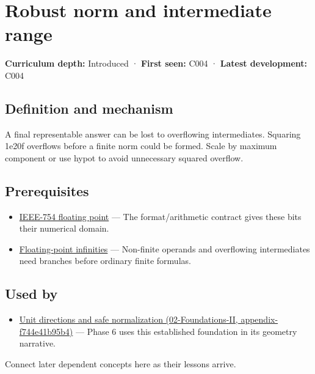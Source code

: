 \hypertarget{appendix-7f1e17dcafb1}{}
\section{Robust norm and intermediate range}\label{appendix-7f1e17dcafb1-robust-norm-and-intermediate-range}

\textbf{Curriculum depth:} Introduced · \textbf{First seen:} C004 · \textbf{Latest development:} C004

\subsection{Definition and mechanism}\label{appendix-7f1e17dcafb1-definition-and-mechanism}

A final representable answer can be lost to overflowing intermediates. Squaring 1e20f overflows before a finite norm could be formed. Scale by maximum component or use hypot to avoid unnecessary squared overflow.

\subsection{Prerequisites}\label{appendix-7f1e17dcafb1-prerequisites}

\begin{itemize}
\tightlist
\item
  \hyperref[appendix-343615f49ddf]{IEEE-754 floating point} --- The format/arithmetic contract gives these bits their numerical domain.
\item
  \hyperref[appendix-eb336149c00a]{Floating-point infinities} --- Non-finite operands and overflowing intermediates need branches before ordinary finite formulas.
\end{itemize}

\subsection{Used by}\label{appendix-7f1e17dcafb1-used-by}

\begin{itemize}
\tightlist
\item
  \href{../02-Foundations-II/main.pdf\#nameddest=appendix-f744e41b95b4}{Unit directions and safe normalization (02-Foundations-II, appendix-f744e41b95b4)} --- Phase 6 uses this established foundation in its geometry narrative.
\end{itemize}

Connect later dependent concepts here as their lessons arrive.

